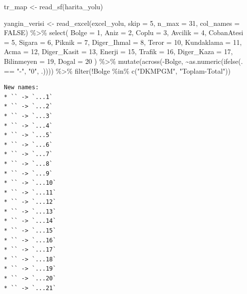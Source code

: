 \documentclass[
  11pt,
  a4paper,
  DIV=11,
  numbers=noendperiod]{scrartcl}
\newenvironment{Shaded}{\begin{snugshade}}{\end{snugshade}}
\newcommand{\AttributeTok}[1]{\textcolor[rgb]{0.40,0.45,0.13}{#1}}
\newcommand{\ConstantTok}[1]{\textcolor[rgb]{0.56,0.35,0.01}{#1}}
\newcommand{\DecValTok}[1]{\textcolor[rgb]{0.68,0.00,0.00}{#1}}
\newcommand{\FunctionTok}[1]{\textcolor[rgb]{0.28,0.35,0.67}{#1}}
\newcommand{\NormalTok}[1]{\textcolor[rgb]{0.00,0.23,0.31}{#1}}
\newcommand{\OtherTok}[1]{\textcolor[rgb]{0.00,0.23,0.31}{#1}}
\newcommand{\SpecialCharTok}[1]{\textcolor[rgb]{0.37,0.37,0.37}{#1}}
\newcommand{\StringTok}[1]{\textcolor[rgb]{0.13,0.47,0.30}{#1}}
\begin{document}
\begin{Shaded}
\begin{Highlighting}[]
\NormalTok{tr\_map }\OtherTok{\textless{}{-}} \FunctionTok{read\_sf}\NormalTok{(harita\_yolu)}

\NormalTok{yangin\_verisi }\OtherTok{\textless{}{-}} \FunctionTok{read\_excel}\NormalTok{(excel\_yolu, }\AttributeTok{skip =} \DecValTok{5}\NormalTok{, }\AttributeTok{n\_max =} \DecValTok{31}\NormalTok{, }\AttributeTok{col\_names =} \ConstantTok{FALSE}\NormalTok{) }\SpecialCharTok{\%\textgreater{}\%}
  \FunctionTok{select}\NormalTok{(}
    \AttributeTok{Bolge =} \DecValTok{1}\NormalTok{,}
    \AttributeTok{Aniz =} \DecValTok{2}\NormalTok{, }\AttributeTok{Coplu =} \DecValTok{3}\NormalTok{, }\AttributeTok{Avcilik =} \DecValTok{4}\NormalTok{, }\AttributeTok{CobanAtesi =} \DecValTok{5}\NormalTok{, }\AttributeTok{Sigara =} \DecValTok{6}\NormalTok{, }\AttributeTok{Piknik =} \DecValTok{7}\NormalTok{, }\AttributeTok{Diger\_Ihmal =} \DecValTok{8}\NormalTok{,}
    \AttributeTok{Teror =} \DecValTok{10}\NormalTok{, }\AttributeTok{Kundaklama =} \DecValTok{11}\NormalTok{, }\AttributeTok{Acma =} \DecValTok{12}\NormalTok{, }\AttributeTok{Diger\_Kasit =} \DecValTok{13}\NormalTok{,}
    \AttributeTok{Enerji =} \DecValTok{15}\NormalTok{, }\AttributeTok{Trafik =} \DecValTok{16}\NormalTok{, }\AttributeTok{Diger\_Kaza =} \DecValTok{17}\NormalTok{,}
    \AttributeTok{Bilinmeyen =} \DecValTok{19}\NormalTok{, }\AttributeTok{Dogal =} \DecValTok{20}
\NormalTok{  ) }\SpecialCharTok{\%\textgreater{}\%}
  \FunctionTok{mutate}\NormalTok{(}\FunctionTok{across}\NormalTok{(}\SpecialCharTok{{-}}\NormalTok{Bolge, }\SpecialCharTok{\textasciitilde{}}\FunctionTok{as.numeric}\NormalTok{(}\FunctionTok{ifelse}\NormalTok{(. }\SpecialCharTok{==} \StringTok{"{-}"}\NormalTok{, }\StringTok{"0"}\NormalTok{, .)))) }\SpecialCharTok{\%\textgreater{}\%}
  \FunctionTok{filter}\NormalTok{(}\SpecialCharTok{!}\NormalTok{Bolge }\SpecialCharTok{\%in\%} \FunctionTok{c}\NormalTok{(}\StringTok{"DKMPGM"}\NormalTok{, }\StringTok{"Toplam{-}Total"}\NormalTok{))}
\end{Highlighting}
\end{Shaded}

\begin{verbatim}
New names:
* `` -> `...1`
* `` -> `...2`
* `` -> `...3`
* `` -> `...4`
* `` -> `...5`
* `` -> `...6`
* `` -> `...7`
* `` -> `...8`
* `` -> `...9`
* `` -> `...10`
* `` -> `...11`
* `` -> `...12`
* `` -> `...13`
* `` -> `...14`
* `` -> `...15`
* `` -> `...16`
* `` -> `...17`
* `` -> `...18`
* `` -> `...19`
* `` -> `...20`
* `` -> `...21`
\end{verbatim}
\end{document}
